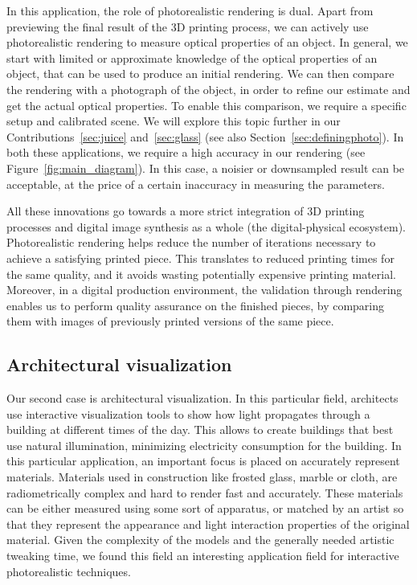 In this application, the role of photorealistic rendering is dual. Apart from previewing the final result of the 3D printing process, we can actively use photorealistic rendering to measure optical properties of an object. In general, we start with limited or approximate knowledge of the optical properties of an object, that can be used to produce an initial rendering. We can then compare the rendering with a photograph of the object, in order to refine our estimate and get the actual optical properties. To enable this comparison, we require a specific setup and calibrated scene. We will explore this topic further in our Contributions~\ref{sec:juice} and~\ref{sec:glass} (see also Section~\ref{sec:definingphoto}). In both these applications, we require a high accuracy in our rendering (see Figure~\ref{fig:main_diagram}). In this case, a noisier or downsampled result can be acceptable, at the price of a certain inaccuracy in measuring the parameters. 

All these innovations go towards a more strict integration of 3D printing processes and digital image synthesis as a whole (the digital-physical ecosystem). Photorealistic rendering helps reduce the number of iterations necessary to achieve a satisfying printed piece. This translates to reduced printing times for the same quality, and it avoids wasting potentially expensive printing material. Moreover, in a digital production  environment, the validation through rendering enables us to perform quality assurance on the finished pieces, by comparing them with images of previously printed versions of the same piece.
\subsection{Architectural visualization}
Our second case is architectural visualization. In this particular field, architects use interactive visualization tools to show how light propagates through a building at different times of the day. This allows to create buildings that best use natural illumination, minimizing electricity consumption for the building. In this particular application, an important focus is placed on accurately represent materials. Materials used in construction like frosted glass, marble or cloth, are radiometrically complex and hard to render fast and accurately. These materials can be either measured using some sort of apparatus, or matched by an artist so that they represent the appearance and light interaction properties of the original material. Given the complexity of the models and the generally needed artistic tweaking time, we found this field an interesting application field for interactive photorealistic techniques.

